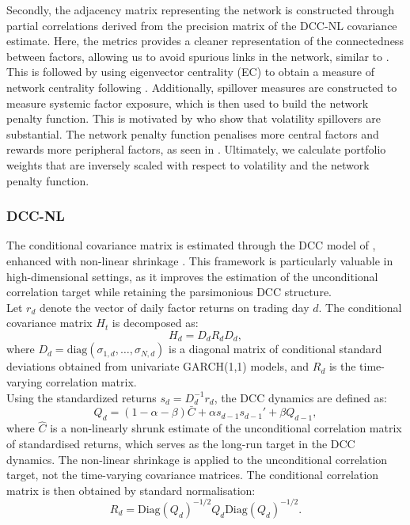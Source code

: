 \documentclass[11pt]{article}
\begin{document}
Secondly, the adjacency matrix representing the network is constructed through partial correlations derived from the precision matrix of the DCC-NL covariance estimate. Here, the metrics provides a cleaner representation of the connectedness between factors, allowing us to avoid spurious links in the network, similar to \cite{peralta2016network}. This is followed by using eigenvector centrality (EC) to obtain a measure of network centrality following \cite{peralta2016network, bonacich2007eigenvector, MisirliScidaVelikov2025}. Additionally, spillover measures are constructed to measure systemic factor exposure, which is then used to build the network penalty function. This is motivated by \cite{DieboldYilmaz2009} who show that volatility spillovers are substantial. The network penalty function penalises more central factors and rewards more peripheral factors, as seen in \cite{MisirliScidaVelikov2025}. Ultimately, we calculate portfolio weights that are inversely scaled with respect to volatility and the network penalty function. 
\subsubsection{DCC-NL}
The conditional covariance matrix is estimated through the DCC model of \cite{engle2002dynamic}, enhanced with non-linear shrinkage \citep{engle2019large}. This framework is particularly valuable in high-dimensional settings, as it improves the estimation of the unconditional correlation target while retaining the parsimonious DCC structure. \\
Let $r_d$ denote the vector of daily factor returns on trading day $d$. The conditional covariance matrix $H_t$ is decomposed as:
\begin{equation} \label{DCC_cond_cov}
H_d = D_d R_d D_d,
\end{equation}
where $D_d = \mathrm{diag}(\sigma_{1,d}, \dots, \sigma_{N,d})$ is a diagonal matrix of conditional standard deviations obtained from univariate GARCH(1,1) models, and $R_d$ is the time-varying correlation matrix. \\
Using the standardized returns $s_d = D_d^{-1} r_d$, the DCC dynamics are defined as: 
\begin{equation} \label{eq:DCC_dynamics}
Q_d = (1 - \alpha - \beta)\bar{C}
+ \alpha s_{d-1}s_{d-1}'
+ \beta Q_{d-1},
\end{equation}
where $\hat{C}$ is a non-linearly shrunk estimate of the unconditional correlation matrix of standardised returns, which serves as the long-run target in the DCC dynamics. The non-linear shrinkage is applied to the unconditional correlation target, not the time-varying covariance matrices. The conditional correlation matrix is then obtained by standard normalisation: 
\begin{equation} \label{eq:DCC_cond_corr}
R_d = \mathrm{Diag}(Q_d)^{-1/2}
Q_d
\mathrm{Diag}(Q_d)^{-1/2}.
\end{equation}
\end{document}

